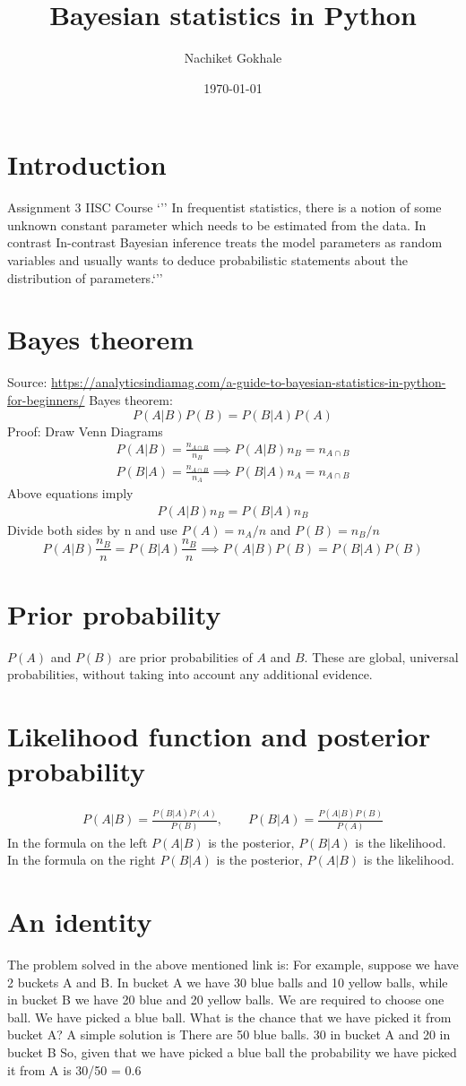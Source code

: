 \documentclass{article}
\newcommand{\beq}{\begin{equation}}
\newcommand{\eeq}{\end{equation}}
\newcommand{\ber}{\begin{eqnarray}}
\newcommand{\eer}{\end{eqnarray}}
\begin{document}
\title{Bayesian statistics in Python}
\author{Nachiket Gokhale}
\date{\today}
\maketitle
\section{Introduction}
Assignment 3 IISC Course
`'' In frequentist statistics, there is a notion of some unknown constant parameter which needs to be estimated from the data. In contrast In-contrast Bayesian inference treats the model parameters as random variables and usually wants to deduce probabilistic statements about the distribution of parameters.`''
\section{Bayes theorem}
Source: \url{https://analyticsindiamag.com/a-guide-to-bayesian-statistics-in-python-for-beginners/}
Bayes theorem:
\beq
P(A|B)P(B) = P(B|A)P(A) 
\eeq
Proof: Draw Venn Diagrams
\ber
P(A|B) = \frac{n_{A\cap{B}}}{n_B} \implies P(A|B)n_B = n_{A\cap{B}}\\
P(B|A) = \frac{n_{A\cap{B}}}{n_A} \implies P(B|A)n_A = n_{A\cap{B}}
\eer
Above equations imply
\ber
P(A|B)n_B = P(B|A)n_B
\eer 
Divide both sides by n and use $P(A)=n_A/n$ and $P(B)=n_B/n$
\beq
\label{eqn:bayesidentity}
P(A|B)\frac{n_B}{n} = P(B|A)\frac{n_B}{n} \implies P(A|B)P(B) = P(B|A)P(B)
\eeq
\section{Prior probability}
$P(A)$ and $P(B)$ are prior probabilities of $A$ and $B$. These are global, universal probabilities, without taking into account any additional evidence.
\section{Likelihood function and posterior probability}
\ber
P(A|B) = \frac{P(B|A)P(A)}{P(B)}, \qquad P(B|A) = \frac{P(A|B)P(B)}{P(A)}
\eer
In the formula on the left $P(A|B)$ is the posterior, $P(B|A)$ is the likelihood.\\
In the formula on the right $P(B|A)$ is the posterior, $P(A|B)$ is the likelihood.
\section{An identity}
The problem solved in the above mentioned link is: For example, suppose we have 2 buckets A and B. 
In bucket A we have 30 blue balls and 10 yellow balls, while in bucket B we have 20 blue and 20 yellow balls.
We are required to choose one ball. We have picked a blue ball. What is the chance that we have picked 
it from bucket A? A simple solution is There are 50 blue balls. 30 in bucket A and 20 in bucket B
So, given that we have picked a blue ball the probability we have picked it from A is 30/50 = 0.6\\
\end{document}
